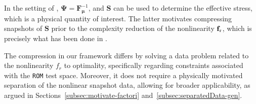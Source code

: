 \documentclass[onefignum,onetabnum]{siamart251104}
\newcommand{\bv}[1]{{\mathbf #1}}
\newcommand{\bt}[1]{{\mathbf{#1}}}
\newcommand{\rom}[1]{{{#1}_{\rm{r}}}}
\newcommand{\ffun}{{\bv{f}}}
\newcommand{\acro}[1]{{\texttt{#1}}}  %
\newcommand{\nlField}{{\bt{S}}}                    %
\newcommand{\geoTrans}{{\boldsymbol{\Psi}}}        %
\begin{document}
\begin{rmrk}
In the setting of \cite{art:Guo2024,art:Guo2024-secOrd}, $\geoTrans=\bt{F}_{\boldsymbol{\mu}}^{-1}$, and ${\nlField}$ can be used to determine the effective stress, which is a physical quantity of interest. The latter motivates compressing snapshots of $\nlField$ prior to the complexity reduction of the nonlinearity $\rom{\ffun}$, which is precisely what has been done in \cite{art:Guo2024,art:Guo2024-secOrd}.

The compression in our framework differs by solving a data problem related to the nonlinearity $f_r$ to optimality, specifically regarding constraints associated with the \acro{ROM} test space. %
Moreover, it does not require a physically motivated separation of the nonlinear snapshot data, allowing for broader applicability, as argued in Sections~\ref{subsec:motivate-factori} and~\ref{subsec:separatedData-gen}.
\end{rmrk}
\end{document}
